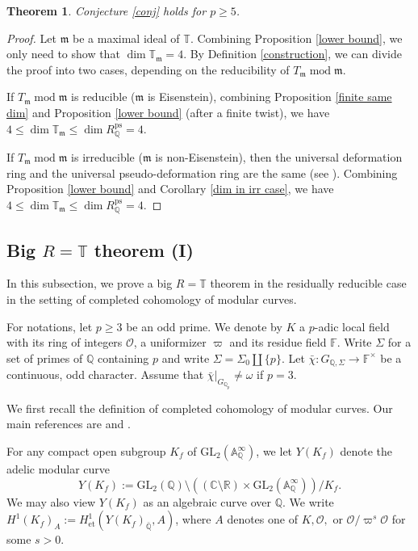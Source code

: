 \documentclass[a4paper, 12pt]{amsart}
\newtheorem{thm}{Theorem}[subsection]
\DeclareMathOperator{\modd}{mod}
\def\ps{\mathrm{ps}}
\newcommand{\F}{\mathbb{F}}
\newcommand{\Q}{\mathbb{Q}}
\newcommand{\T}{\mathbb{T}}
\newcommand{\A}{\mathbb{A}}
\newcommand{\GL}{\mathrm{GL}}
\newcommand{\cO}{\mathcal{O}}
\newcommand{\km}{\mathfrak{m}}
\begin{document}
    \begin{thm}\label{main thm for emerton}
    	Conjecture \ref{conj} holds for $p \ge 5$.
    \end{thm}
    
    \begin{proof}
    	Let $\km$ be a maximal ideal of $\T$. Combining Proposition \ref{lower bound}, we only need to show that $\dim \T_{\km}=4$. By Definition \ref{construction}, we can divide the proof into two cases, depending on the reducibility of $T_\km \modd \km$. 
    	
    	If $T_\km \modd \km$ is reducible ($\km$ is Eisenstein), combining Proposition \ref{finite same dim} and Proposition \ref{lower bound} (after a finite twist), we have $4 \le \dim \T_\km \le \dim R_{\Q}^\ps =4$.
    	
    	If $T_\km \modd \km$ is irreducible ($\km$ is non-Eisenstein), then the universal deformation ring and the universal pseudo-deformation ring are the same (see \cite[Theorem 2.4.1, page 44]{Berger_2013}). Combining Proposition \ref{lower bound} and Corollary \ref{dim in irr case}, we have $4 \le \dim \T_\km \le \dim R_{\Q}^\ps =4$.
    \end{proof}
    
    \subsection{Big $R=\T$ theorem (I)}
    In this subsection, we prove a big $R=\T$ theorem in the residually reducible case in the setting of completed cohomology of modular curves.
    
    For notations, let $p \ge 3$ be an odd prime. We denote by $K$  a $p$-adic local field with its ring of integers $\cO$, a uniformizer $\varpi$ and its residue field $\F$. Write $\Sigma$ for a set of primes of $\Q$ containing $p$ and write $\Sigma= \Sigma_0 \amalg \{p\}$. Let $\bar{\chi} : G_{\Q, \Sigma} \to \F^\times$ be a continuous, odd character. Assume that $\bar{\chi}|_{G_{\Q_p}} \ne \omega$ if $p=3$.
    
    We first recall the definition of completed cohomology of modular curves. Our main references are \cite[Section 5]{emerton11} and \cite[Section 2]{Nakamura2023}.
    
    For any compact open subgroup $K_f$ of $\GL_2(\A_\Q^\infty)$, we let $Y(K_f)$ denote the adelic modular curve
    $$Y(K_f) := \GL_2(\Q)\setminus ((\mathbb{C}\setminus \mathbb{R}) \times \GL_2(\A_\Q^\infty))/K_f.$$
    We may also view $Y(K_f)$ as an algebraic curve over $\Q$. We write $H^1(K_f)_A:= H_{\operatorname{et}}^1(Y(K_f)_{\bar{\Q}}, A)$, where $A$ denotes one of $K, \cO, $ or $\cO/\varpi^s\cO$ for some $s>0$.
    
\end{document}

